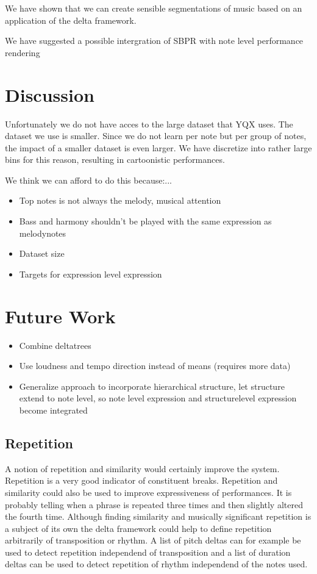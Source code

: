\documentclass[a4paper,10pt]{article}
\begin{document}
We have shown that we can create sensible segmentations of music based on an application of the delta framework. \cite{markwin} 

We have suggested a possible intergration of SBPR with note level performance rendering
\section{Discussion}

Unfortunately we do not have acces to the large dataset that YQX uses. The dataset we use is smaller. Since we do not learn per note but per group of notes, the impact of a smaller dataset is even larger. We have discretize into rather large bins for this reason, resulting in cartoonistic performances. 

We think we can afford to do this because:...

\begin{itemize}
\item Top notes is not always the melody, musical attention
\item Bass and harmony shouldn't be played with the same expression as melodynotes
\item Dataset size
\item Targets for expression level expression
\end{itemize}

\section{Future Work}
\begin{itemize}
\item Combine deltatrees
\item Use loudness and tempo direction instead of means (requires more data)
\item Generalize approach to incorporate hierarchical structure, let structure extend to note level, so note level expression and structurelevel expression become integrated
\end{itemize}
\subsection{Repetition}
A notion of repetition and similarity would certainly improve the system. Repetition is a very good indicator of constituent breaks. Repetition and similarity could also be used to improve expressiveness of performances. It is probably telling when a phrase is repeated three times and then slightly altered the fourth time. Although finding similarity and musically significant repetition is a subject of its own the delta framework could help to define repetition arbitrarily of transposition or rhythm. A list of pitch deltas can for example be used to detect repetition independend of transposition and a list of duration deltas can be used to detect repetition of rhythm independend of the notes used. 

  
 
 
\end{document}
